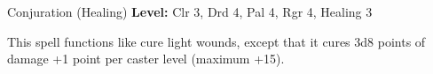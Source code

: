 {Conjuration (Healing)}
{
	\textbf{Level:}
	Clr 3, Drd 4, Pal 4, Rgr 4, Healing 3\\
}
{
	This spell functions like cure light wounds, except that it cures 3d8 points of damage +1 point per caster level (maximum +15).

}

